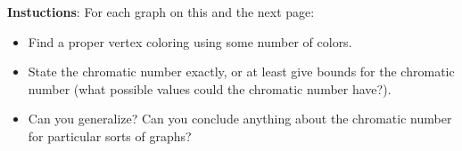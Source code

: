 \documentclass[11pt]{exam}
\begin{document}

\noindent\textbf{Instuctions}: For each graph on this and the next page:
\begin{itemize}
  \item Find a proper vertex coloring using some number of colors.
  \item State the chromatic number exactly, or at least give bounds for the chromatic number (what possible values could the chromatic number have?).
  \item Can you generalize?  Can you conclude anything about the chromatic number for particular sorts of graphs?
\end{itemize}
\end{document}
